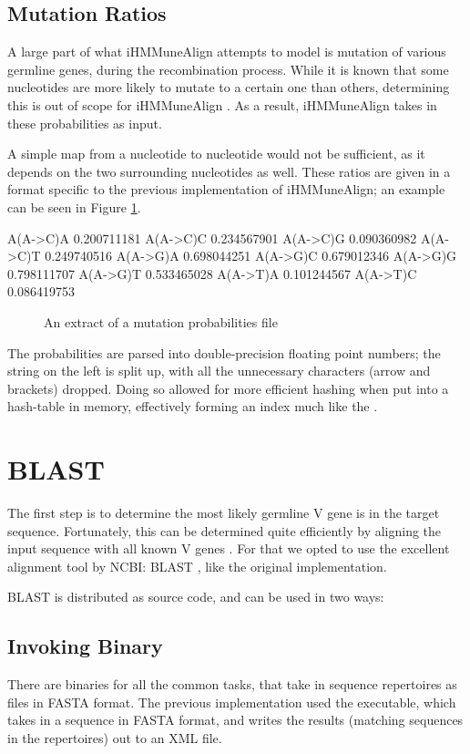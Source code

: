 \subsection{Mutation Ratios}
A large part of what iHMMuneAlign attempts to model is mutation of various germline genes, during the recombination process. While it is known that some nucleotides are more likely to mutate to a certain one than others, determining this is out of scope for iHMMuneAlign \autocite{iHMMuneAlign}. As a result, iHMMuneAlign takes in these probabilities as input.

A simple map from a nucleotide to nucleotide would not be sufficient, as it depends on the two surrounding nucleotides as well. These ratios are given in a format specific to the previous implementation of iHMMuneAlign; an example can be seen in Figure \ref{fig:mutation-probs}.

\begin{verbbox}
A(A->C)A 	0.200711181
A(A->C)C 	0.234567901
A(A->C)G 	0.090360982
A(A->C)T 	0.249740516
A(A->G)A 	0.698044251
A(A->G)C 	0.679012346
A(A->G)G 	0.798111707
A(A->G)T 	0.533465028
A(A->T)A 	0.101244567
A(A->T)C 	0.086419753
\end{verbbox}

\begin{figure}
    \label{fig:mutation-probs}
    \centering
    \theverbbox
    \caption{An extract of a mutation probabilities file}
\end{figure}

The probabilities are parsed into double-precision floating point numbers; the string on the left is split up, with all the unnecessary characters (arrow and brackets) dropped. Doing so allowed for more efficient hashing when put into a hash-table in memory, effectively forming an index much like the .

\section{BLAST}
The first step is to determine the most likely germline V gene is in the target sequence. Fortunately, this can be determined quite efficiently by aligning the input sequence with all known V genes \cite{iHMMuneAlign}. For that we opted to use the excellent alignment tool by NCBI: BLAST \cite{blast}, like the original implementation.

BLAST is distributed as source code, and can be used in two ways:
\subsection{Invoking Binary}
\label{sec:blast-bin}
There are binaries for all the common tasks, that take in sequence repertoires as files in FASTA \autocite{fasta} format. The previous implementation used the  executable, which takes in a sequence in FASTA format, and writes the results (matching sequences in the repertoires) out to an XML file.

